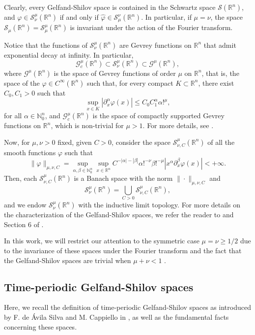 \documentclass[11pt,reqno]{amsart}
\numberwithin{equation}{section}
\theoremstyle{definition}
\theoremstyle{definition}
\newcommand{\R}{\mathbb{R}}
\newcommand{\N}{\mathbb{N}}
\begin{document}
Clearly, every Gelfand-Shilov space is contained in the Schwartz space $\mathcal{S}(\R^n)$, and  $\varphi\in\mathcal{S}_{\nu}^{\mu}(\R^n)$ if and only if $\widehat{\varphi}\in\mathcal{S}_{\mu}^{\nu}(\R^n)$. In particular, if $\mu=\nu$, the space $\mathcal{S}_\mu(\R^n)=\mathcal{S}_\mu^\mu(\R^n)$ is invariant under the action of the Fourier transform. 

Notice that the functions of $\mathcal{S}_\nu^\mu(\R^n)$ are Gevrey functions on $\R^n$ that admit exponential decay at infinity. In particular,
\[\mathscr{G}_c^\mu(\R^n)\subset \mathcal{S}^\mu_\nu(\R^n)\subset \mathscr{G}^\mu(\R^n),\]
where $\mathscr{G}^\mu(\R^n)$ is the space of Gevrey functions of order $\mu$ on $\R^n$, that is, the space of the $\varphi\in C^\infty(\R^n)$ such that, for every compact $K\subset\R^n$, there exist $C_0,C_1>0$ such that
\[\sup_{x\in K}|\partial_x^\alpha \varphi(x)|\leq C_0 C_1^{\alpha}\alpha!^\mu,\]
for all $\alpha\in\N_0^n$, and $\mathscr{G}_c^\mu(\R^n)$ is the space of compactly supported Gevrey functions on $\R^n$, which is non-trivial for $\mu> 1$. For more details, see \cite[Chapter I]{Rod_Gevrey}.

Now, for $\mu,\nu>0$ fixed, given $C>0$, consider the space $\mathcal{S}^\mu_{\nu,C}(\R^n)$ of all the smooth functions $\varphi$ such that
\[\|\varphi\|_{\mu,\nu,C}=\sup_{\alpha,\beta\in\N_0^n}\sup_{x\in\R^n}C^{-|\alpha|-|\beta|}\alpha!^{-\nu}\beta!^{-\mu}|x^\alpha\partial_x^\beta \varphi(x)|<+\infty.\]
Then, each $\mathcal{S}^\mu_{\nu,C}(\R^n)$ is a Banach space with the norm $\|\cdot\|_{\mu,\nu,C}$ and
\[\mathcal{S}^\mu_\nu(\R^n) = \bigcup_{C>0}\mathcal{S}^\mu_{\nu,C}(\R^n),\]
and we endow $\mathcal{S}^\mu_\nu(\R^n)$ with the inductive limit topology. For more details on the characterization of the Gelfand-Shilov spaces, we refer the reader to \cite{Petersson} and Section 6 of \cite{NicRod}.

In this work, we will restrict our attention to the symmetric case $\mu=\nu\geq1/2$ due to the invariance of these spaces under the Fourier transform and the fact that the Gelfand-Shilov spaces are trivial when $\mu+\nu<1$ \cite[Theorem 6.1.10]{NicRod}.


\subsection{Time-periodic Gelfand-Shilov spaces}

Here, we recall the definition of time-periodic Gelfand-Shilov spaces as introduced by F. de \'Avila Silva and M. Cappiello in \cite{AvCap2022}, as well as the fundamental facts concerning these spaces.
\end{document}
